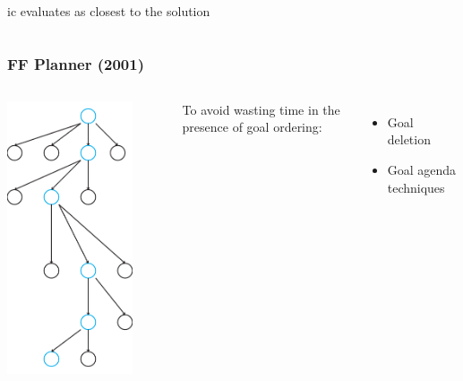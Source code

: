 \documentclass{beamer}
\let\origframetitle=\frametitle
\renewcommand\frametitle[1]{\origframetitle{\textbf{\large{\textrm{#1}}}}}
\begin{document}
\begin{frame}
\begin{columns}
\begin{itemize}
ic evaluates as closest to the solution
\end{itemize}
\end{columns}
\end{frame}


\begin{frame}
  \frametitle{FF Planner (2001)}
\begin{columns}

  \includegraphics[width=0.8\textwidth]{images/ffplan.pdf}

  To avoid wasting time in the presence of goal ordering:

  \begin{itemize}
    \item Goal deletion
    \item Goal agenda techniques
  \end{itemize}
\end{columns}
\end{frame}
\end{document}
